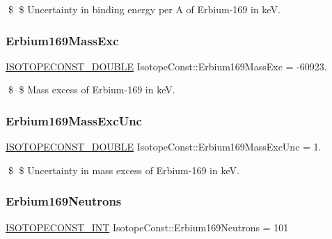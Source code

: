\$ \$ Uncertainty in binding energy per A of Erbium-\/169 in keV. \mbox{\label{group___isotope_const-_erbium-_er169_gae4af7f3191c0d5ac8f4e275d887be88d}} 
\subsubsection{\texorpdfstring{Erbium169\+Mass\+Exc}{Erbium169MassExc}}
{\footnotesize\ttfamily \mbox{\hyperlink{group___isotope_const-_macros_ga8f45a7272ce02c0b4c65c44636ed719a}{I\+S\+O\+T\+O\+P\+E\+C\+O\+N\+S\+T\+\_\+\+D\+O\+U\+B\+LE}} Isotope\+Const\+::\+Erbium169\+Mass\+Exc = -\/60923.}

\$ \$ Mass excess of Erbium-\/169 in keV. \mbox{\label{group___isotope_const-_erbium-_er169_ga442b3b7036a0856859ed61b3665d874c}} 
\subsubsection{\texorpdfstring{Erbium169\+Mass\+Exc\+Unc}{Erbium169MassExcUnc}}
{\footnotesize\ttfamily \mbox{\hyperlink{group___isotope_const-_macros_ga8f45a7272ce02c0b4c65c44636ed719a}{I\+S\+O\+T\+O\+P\+E\+C\+O\+N\+S\+T\+\_\+\+D\+O\+U\+B\+LE}} Isotope\+Const\+::\+Erbium169\+Mass\+Exc\+Unc = 1.}

\$ \$ Uncertainty in mass excess of Erbium-\/169 in keV. \mbox{\label{group___isotope_const-_erbium-_er169_gade30024f29e7146358888a586e740c61}} 
\subsubsection{\texorpdfstring{Erbium169\+Neutrons}{Erbium169Neutrons}}
{\footnotesize\ttfamily \mbox{\hyperlink{group___isotope_const-_macros_ga5f18360b3e99483a35c32d789e62621c}{I\+S\+O\+T\+O\+P\+E\+C\+O\+N\+S\+T\+\_\+\+I\+NT}} Isotope\+Const\+::\+Erbium169\+Neutrons = 101}

